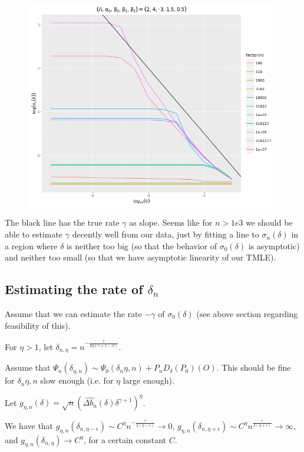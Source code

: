 \documentclass[a4paper]{article}
\begin{document}
\begin{figure}[!htbp]
   \includegraphics[scale = 0.35]{sigm_n(delta)-easy-tp.png}
\end{figure}

The black line has the true rate $\gamma$ as slope. Seems like for $n > 1e3$ we should be able to estimate $\gamma$ decently well from our data, just by fitting a line to $\sigma_n(\delta)$ in a region where $\delta$ is neither too big (so that the behavior of $\sigma_0(\delta)$ is asymptotic) and neither too small (so that we have asymptotic linearity of our TMLE).

\subsection{Estimating the rate of $\delta_n$}

Assume that we can estimate the rate $-\gamma$ of $\sigma_0(\delta)$ (see above section regarding feasibility of this).

For $\eta > 1$, let $\delta_{n, \eta} = n^{-\frac{1}{2 \eta (\gamma + 1 - \beta)}}$.

Assume that $\Psi_n(\delta_{\eta, n}) \sim \Psi_0(\delta_n{\eta, n}) + P_n D_\delta(P_0)(O)$. This should be fine for $\delta_n{\eta, n}$ slow enough (i.e. for $\eta$ large enough).

Let $g_{\eta, n}(\delta) = \sqrt{n} \left( \widehat{\Delta b_n}(\delta) \delta^{\gamma + 1} \right)^\eta$.

We have that $g_{\eta, n}(\delta_{n, \eta - \epsilon}) \sim C^\eta n^{-\frac{\epsilon}{2(\eta - \epsilon)}} \rightarrow 0$, $g_{\eta, n}(\delta_{n, \eta + \epsilon}) \sim C^\eta n^{\frac{\epsilon}{2(\eta + \epsilon)}} \rightarrow \infty$, and $g_{\eta, n}(\delta_{n, \eta}) \rightarrow C^\eta$, for a certain constant $C$.
\end{document}

